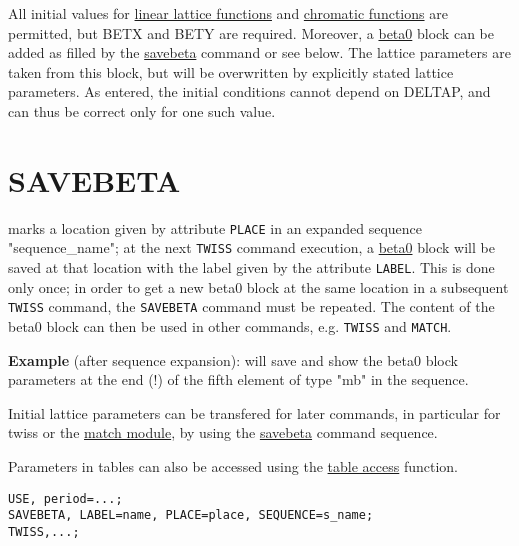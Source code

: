 All initial values for \href{../Introduction/tables.html#linear}{linear
  lattice functions} and
\href{../Introduction/tables.html#chrom}{chromatic functions} are
permitted, but BETX and BETY are required. Moreover, a
\href{beta0}{beta0} block can be added as filled by the
\href{../control/general.html#savebeta}{savebeta} command or see
below. The lattice parameters are taken from this block, but will be
overwritten by explicitly stated lattice parameters. As entered, the
initial conditions cannot depend on DELTAP, and can thus be correct only
for one such value.  

\section{SAVEBETA}
\label{sec:savebeta}
marks a location given by attribute {\tt PLACE} in an expanded sequence 
"sequence\_name"; 
at the next {\tt TWISS} command execution, a
\href{../twiss/twiss.html#beta0}{beta0} 
block will be saved at that location with the label given by the
attribute {\tt LABEL}. 
This is done only once; in order to get a new beta0 block at the same
location in a subsequent {\tt TWISS} command, the {\tt SAVEBETA}
command  must be repeated.
The content of the beta0 block can then be used in other
commands, e.g. {\tt TWISS} and {\tt MATCH}.  

{\bf Example} (after sequence expansion): 
will save and show the beta0 block parameters at the end (!) of the
fifth element of type "mb" in the sequence.  



Initial lattice parameters can be transfered for later commands, in
particular for twiss or the \href{../match/match.html}{match module}, by
using the \href{../control/general.html#savebeta}{savebeta} command
sequence.  

Parameters in tables can also be accessed 
using the \href{../Introduction/expression.html#table}{table access}
function. 
\begin{verbatim}
USE, period=...;
SAVEBETA, LABEL=name, PLACE=place, SEQUENCE=s_name;
TWISS,...;
\end{verbatim}

